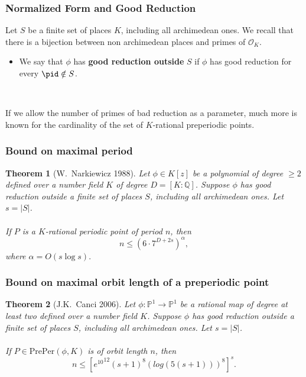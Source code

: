 \documentclass{beamer}
\def\jump{ \quad \\ \vspace{0.7cm} \pause}
\def\PP{{\mathbb P}}
\def\QQ{{\mathbb Q}}
\theoremstyle{thmstyle}
\theoremstyle{thmstyle}
\newtheorem*{mythm}{Theorem}
\theoremstyle{mystyle}
\theoremstyle{qstnstyle}
\begin{document}
\begin{frame}
\frametitle{Normalized Form and Good Reduction}
Let $S$ be a finite set of places $K$, including all archimedean ones. \pause We recall that there is a bijection between non archimedean places and primes of $\mathcal{O}_K$.
\jump
\begin{itemize}
\item We say that $\phi$  has \textbf{good reduction outside} $S$ if $\phi$ has good reduction for every $\pid \notin S$.

\jump
\end{itemize}

If we allow the number of primes of bad reduction as a parameter, much more is known for the cardinality of the set of $K$-rational preperiodic points. 
\end{frame}



\begin{frame}
\frametitle{Bound on maximal period}
\begin{mythm}[W.\ Narkiewicz 1988]
Let $\phi \in K[z]$ be a polynomial of degree $\geq{2}$
defined over a number field $K$ of degree $D=[K:\QQ]$. 
Suppose $\phi$ has good reduction outside a finite set of places $S$, including all archimedean ones. Let $s=|S|$.
\\\quad\\
If $P$ is a $K$-rational periodic point of period $n$, then
$$ n \leq (6\cdot 7^{D+2s})^\alpha,$$ where $\alpha=O(s\log{s}).$
\end{mythm}
\end{frame}




\begin{frame}
\frametitle{Bound on maximal orbit length of a preperiodic point}
\begin{mythm}[J.K.\ Canci 2006]
Let $\phi : \PP^1\to\PP^1$ be a rational map of degree at least two
defined over a number field $K$. 
Suppose $\phi$ has good reduction outside a finite set of places $S$, including all archimedean ones. Let $s=|S|$.
\\\quad\\
If $P\in\text{PrePer}(\phi,K)$ is of orbit length $n$, then
$$n\leq\left[{e^{10}}^{12}(s+1)^8(log(5(s+1)))^8\right]^s.$$
\end{mythm}
\end{frame}
\end{document}
